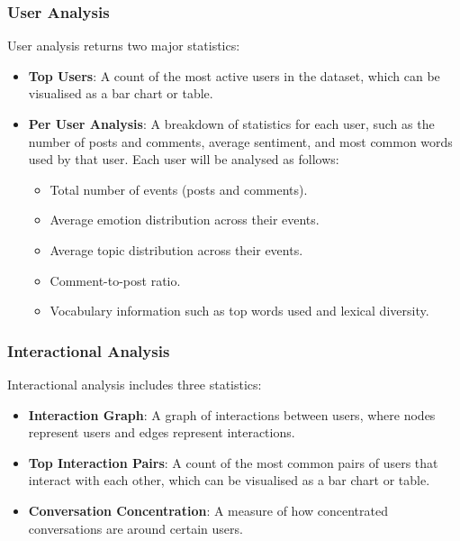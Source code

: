 \documentclass[12pt, a4paper]{article}
\begin{document}
\subsubsection{User Analysis}
User analysis returns two major statistics:
\begin{itemize}
    \item \textbf{Top Users}: A count of the most active users in the dataset, which can be visualised as a bar chart or table.
    \item \textbf{Per User Analysis}: A breakdown of statistics for each user, such as the number of posts and comments, average sentiment, and most common words used by that user. Each user will be analysed as follows:
    \begin{itemize}
        \item Total number of events (posts and comments).
        \item Average emotion distribution across their events.
        \item Average topic distribution across their events.
        \item Comment-to-post ratio.
        \item Vocabulary information such as top words used and lexical diversity.
    \end{itemize}
\end{itemize}

\subsubsection{Interactional Analysis}
Interactional analysis includes three statistics:
\begin{itemize}
    \item \textbf{Interaction Graph}: A graph of interactions between users, where nodes represent users and edges represent interactions.
    \item \textbf{Top Interaction Pairs}: A count of the most common pairs of users that interact with each other, which can be visualised as a bar chart or table.
    \item \textbf{Conversation Concentration}: A measure of how concentrated conversations are around certain users.
\end{itemize}
\end{document}
